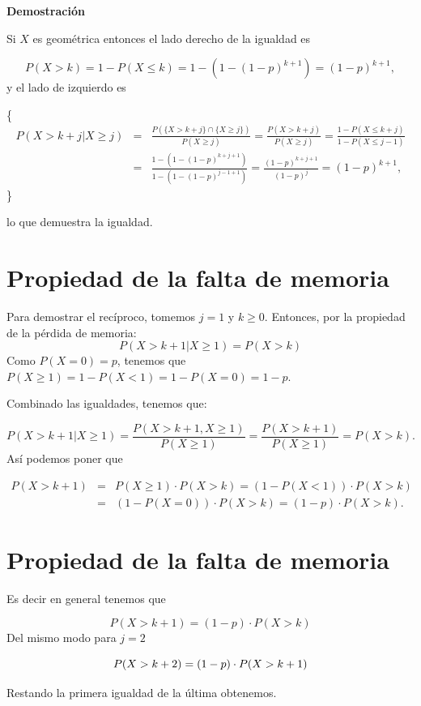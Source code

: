 \documentclass[
  letterpaper,
  DIV=11,
  numbers=noendperiod]{scrreprt}
\begin{document}
\textbf{Demostración}

Si \(X\) es geométrica entonces el lado derecho de la igualdad es

\[
P(X>k)=1-P(X\leq k)=1-\left(1-(1-p)^{k+1}\right)=(1-p)^{k+1},
\] y el lado de izquierdo es

\scriptsize\{ \begin{eqnarray*}
P\left(X> k+j\big| X\geq j\right)&=&\frac{P\left(\{X> k+j\}\cap \{X\geq j\} \right)}{P\left(X\geq j\right)}=
\frac{P\left(X>k+j \right)}{P\left(X\geq j \right)} = \frac{1-P(X\leq k+j)}{1-P(X\leq j-1)}\\
&=&  \frac{1-(1-(1-p)^{k+j+1})}{1-(1-(1-p)^{j-1+1})} =\frac{(1-p)^{k+j+1}}{(1-p)^{j}} = (1-p)^{k+1},
\end{eqnarray*} \} \normalsize

lo que demuestra la igualdad.

\section{Propiedad de la falta de
memoria}\label{propiedad-de-la-falta-de-memoria-2}

Para demostrar el recíproco, tomemos \(j=1\) y \(k\geq 0\). Entonces,
por la propiedad de la pérdida de memoria: \[
P\left(X> k+1\big| X\geq 1\right)=P(X> k)
\] Como \(P(X=0)=p\), tenemos que
\(P(X \geq 1 )=1-P(X<1)=1-P(X=0)=1-p\).

Combinado las igualdades, tenemos que:

\[
P\left(X> k+1\big| X\geq 1\right)=\frac{P(X>k+1, X\geq 1)}{P(X\geq 1)}=\frac{P(X>k+1)}{P(X\geq 1)}=P(X>k).
\] Así podemos poner que

\begin{eqnarray*}
P(X>k+1)&=&P(X\geq 1)\cdot P(X>k)=\left(1-P(X<1)\right)\cdot P(X>k)\\
&=&\left(1-P(X=0)\right)\cdot P(X>k)=(1-p)\cdot P(X>k).
\end{eqnarray*}

\section{Propiedad de la falta de
memoria}\label{propiedad-de-la-falta-de-memoria-3}

Es decir en general tenemos que

\[
P(X>k+1)=(1-p)\cdot P(X>k)
\] Del mismo modo para \(j=2\)

\[
\scriptsize{P(X>k+2)=(1-p)\cdot P(X>k+1)}
\]

Restando la primera igualdad de la última obtenemos.
\end{document}
